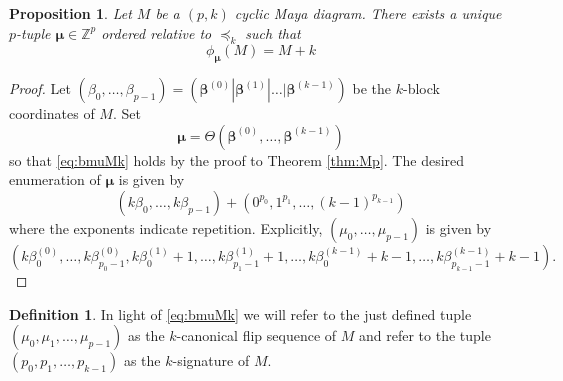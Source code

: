 \documentclass{amsart}
\newtheorem{proposition}{Proposition}
\theoremstyle{definition}
\newtheorem{definition}{Definition}
\newcommand{\Z}{\mathbb{Z}}
\newcommand{\bbeta}{{\boldsymbol{\beta}}}
\newcommand{\bmu}{{\boldsymbol{\mu}}}
\newcommand{\cZ}{\mathcal{Z}}
\begin{document}
\begin{proposition}
  \label{prop:mufrombeta}
  Let $M$ be a $(p,k)$ cyclic Maya diagram.  There exists a unique
  $p$-tuple $\bmu\in \Z^p$ ordered relative to $\preccurlyeq_k$ such
  that
  \begin{equation}
    \label{eq:bmuMk}
    \phi_\bmu(M) = M+k 
  \end{equation}
\end{proposition}
\begin{proof}
  Let
  $(\beta_0,\ldots, \beta_{p-1}) =  (\bbeta^{(0)} | \bbeta^{(1)} | \ldots |   \bbeta^{(k-1)})$ be the $k$-block coordinates of $M$.
  Set \[ \bmu = \Theta\left(\bbeta^{(0)}, \ldots , \bbeta^{(k-1)}\right) \]
  so that \eqref{eq:bmuMk} holds by the proof to Theorem \ref{thm:Mp}.
  The desired enumeration of $\bmu$ is given by
  \[ (k \beta_0,\ldots, k \beta_{p-1}) + (0^{p_0}, 1^{p_1}, \ldots,
  (k-1)^{p_{k-1}}) \]
  where the exponents indicate repetition.  Explicitly,
  $(\mu_0,\ldots, \mu_{p-1})$ is given by
  \[ \left(k\beta^{(0)}_{0},\ldots, k\beta^{(0)}_{p_0-1}, k\beta^{(1)}_{0} + 1 ,\ldots,
  k\beta^{(1)}_{p_1-1} +1 , \ldots , k \beta^{(k-1)}_{0} + k-1, \ldots,
  k\beta^{(k-1)}_{p_{k-1}-1} + k-1 \right) .\]
\end{proof}
\begin{definition}
  In light of \eqref{eq:bmuMk} we will refer to the just defined tuple
  $(\mu_0,\mu_1,\ldots, \mu_{p-1})$ as the $k$-canonical flip sequence
  of $M$ and refer to the tuple $(p_0,p_1,\ldots, p_{k-1})$ as the
  $k$-signature of $M$.
\end{definition}
\end{document}
